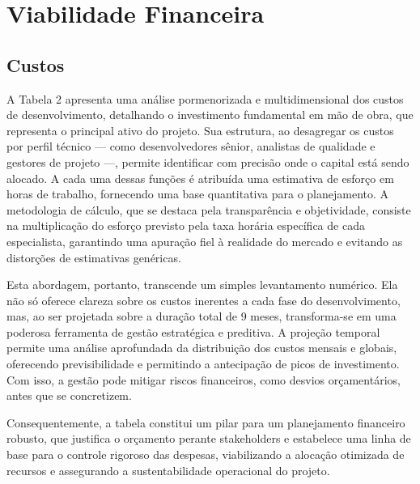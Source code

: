 \documentclass[
	12pt,				%
	openany,			%
	twoside,			%
	a4paper,			%
	english,			%
	brazil				%
	]{abntex2}
\begin{document}
\chapter{Viabilidade Financeira}

\section{Custos}

A Tabela 2 apresenta uma análise pormenorizada e multidimensional dos custos de desenvolvimento, detalhando o investimento fundamental em mão de obra, que representa o principal ativo do projeto. Sua estrutura, ao desagregar os custos por perfil técnico — como desenvolvedores sênior, analistas de qualidade e gestores de projeto —, permite identificar com precisão onde o capital está sendo alocado. A cada uma dessas funções é atribuída uma estimativa de esforço em horas de trabalho, fornecendo uma base quantitativa para o planejamento. A metodologia de cálculo, que se destaca pela transparência e objetividade, consiste na multiplicação do esforço previsto pela taxa horária específica de cada especialista, garantindo uma apuração fiel à realidade do mercado e evitando as distorções de estimativas genéricas.

Esta abordagem, portanto, transcende um simples levantamento numérico. Ela não só oferece clareza sobre os custos inerentes a cada fase do desenvolvimento, mas, ao ser projetada sobre a duração total de 9 meses, transforma-se em uma poderosa ferramenta de gestão estratégica e preditiva. A projeção temporal permite uma análise aprofundada da distribuição dos custos mensais e globais, oferecendo previsibilidade e permitindo a antecipação de picos de investimento. Com isso, a gestão pode mitigar riscos financeiros, como desvios orçamentários, antes que se concretizem.

Consequentemente, a tabela constitui um pilar para um planejamento financeiro robusto, que justifica o orçamento perante stakeholders e estabelece uma linha de base para o controle rigoroso das despesas, viabilizando a alocação otimizada de recursos e assegurando a sustentabilidade operacional do projeto.
\end{document}
